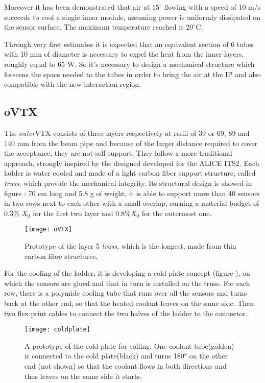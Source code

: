 Moreover it has been demonstrated that air at $15^{\circ}$ flowing with a speed of 10 m/s succeeds to cool a single inner module, assuming power is uniformly dissipated on the sensor surface. The maximum temperature reached is $20^{\circ}$C. 

Through very first estimates it is expected that an equivalent section of 6 tubes with 10 mm of diameter is necessary to expel the heat from the inner layers, roughly equal to 65 W. So it's necessary to design a mechanical structure which forseens the space needed to the tubes in order to bring the air at the IP and also compatible with the new interaction region.


\subsection{oVTX}

The \textit{outer}VTX consists of three layers respectively at radii of 39 or 69, 89 and 140 mm from the beam pipe and because of the larger distance required to cover the acceptance, they are not self-support. They follow a more traditional approach, strongly inspired by the designed developed for the ALICE ITS2. Each ladder is water cooled and made of a light carbon fiber support structure, called \textit{truss}, which provide the mechanical integrity. Its structural design is showed in figure : 70 cm long and 5.8 g of weight, it is able to support more than 40 sensors in two rows next to each other with a small overlap, earning a material budget of 0.3\% $X_{0}$ for the first two layer and 0.8\%$X_{0}$  for the outermost one.

\begin{figure}[h!]
\centering
\texttt{[image: oVTX]}
\caption{Prototype of the layer 5 \textit{truss}, which is the longest, made from thin carbon fibre structures.}
\label{fig:oVTX}
\end{figure}


For the cooling of the ladder, it is developing a cold-plate concept (figure ), on which the sensors are glued and that in turn is installed on the truss. For each row, there is a polymide cooling tube that runs over all the sensors and turns back at the other end, so that the heated coolant leaves on the same side. Then two flex print cables to connect the two halves of the ladder to the connector.


\begin{figure}[h!]
\centering
\texttt{[image: coldplate]}
\caption{A prototype of the cold-plate for colling. One coolant tube(golden) is connected to the cold plate(black) and turns 180° on the other end (not shown) so that the coolant flows in both directions and thus leaves on the same side it starts.}
\label{fig:oVTX_coldplate}
\end{figure}

